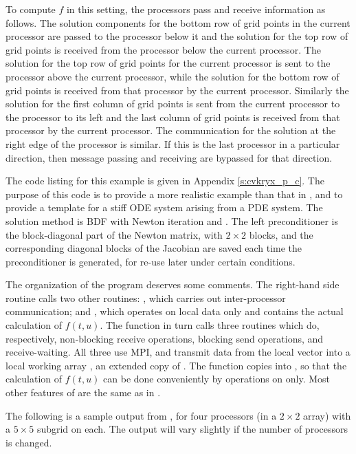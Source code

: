 To compute $f$ in this setting, the processors pass and receive
information as follows.  The solution components for the bottom row of
grid points in the current processor are passed to the processor below
it and the solution for the top row of grid points is received from
the processor below the current processor. The solution for the top
row of grid points for the current processor is sent to the processor
above the current processor, while the solution for the bottom row of
grid points is received from that processor by the current
processor. Similarly the solution for the first column of grid points
is sent from the current processor to the processor to its left and
the last column of grid points is received from that processor by the
current processor. The communication for the solution at the right
edge of the processor is similar. If this is the last processor in a
particular direction, then message passing and receiving are bypassed
for that direction.

The code listing for this example is given in Appendix \ref{s:cvkryx_p_c}.
The purpose of this code is to provide a more realistic example than
that in , and to provide a template for a stiff ODE system
arising from a PDE system. The solution method is BDF with Newton
iteration and {\spgmr}. The left preconditioner is the block-diagonal
part of the Newton matrix, with $2 \times 2$ blocks, and the
corresponding diagonal blocks of the Jacobian are saved each time the
preconditioner is generated, for re-use later under certain conditions.

The organization of the  program deserves some comments. The
right-hand side routine  calls two other routines: , which
carries out inter-processor communication; and , which operates on
local data only and contains the actual calculation of $f(t,u)$. The 
 function in turn calls three routines which do, respectively,
non-blocking receive operations, blocking send operations, and
receive-waiting. All three use MPI, and transmit data from the local 
vector into a local working array , an extended copy of .
The  function copies  into , so that the
calculation of $f(t,u)$ can be done conveniently by operations on 
 only.  Most other features of  are the same as in
.

The following is a sample output from , for four processors
(in a $2 \times 2$ array) with a $5 \times 5$ subgrid on each.
The output will vary slightly if the number of processors is changed.

